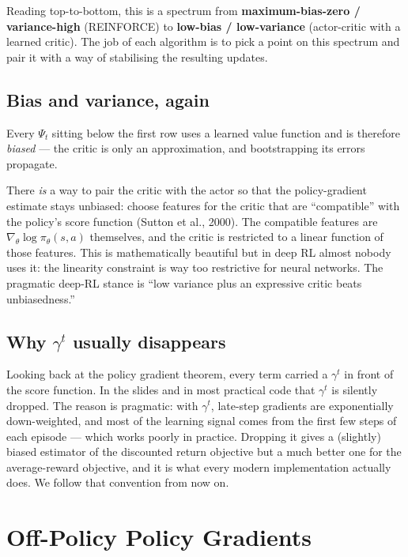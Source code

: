 \documentclass[11pt, oneside]{book}
\begin{document}
Reading top-to-bottom, this is a spectrum from \textbf{maximum-bias-zero / variance-high}
(REINFORCE) to \textbf{low-bias / low-variance} (actor-critic with a learned critic).
The job of each algorithm is to pick a point on this spectrum and pair it with a way
of stabilising the resulting updates.

\subsection{Bias and variance, again}

Every $\Psi_t$ sitting below the first row uses a learned value function and is
therefore \emph{biased} --- the critic is only an approximation, and bootstrapping its
errors propagate.

\begin{intbox}[title={Compatible function approximation (briefly)}]
There \emph{is} a way to pair the critic with the actor so that the policy-gradient
estimate stays unbiased: choose features for the critic that are ``compatible'' with
the policy's score function (Sutton et al., 2000). The compatible features are
$\nabla_\theta \log \pi_\theta(s,a)$ themselves, and the critic is restricted to a
linear function of those features.
This is mathematically beautiful but in deep RL almost nobody uses it: the linearity
constraint is way too restrictive for neural networks.
The pragmatic deep-RL stance is ``low variance plus an expressive critic beats unbiasedness.''
\end{intbox}

\subsection{Why $\gamma^t$ usually disappears}

Looking back at the policy gradient theorem, every term carried a $\gamma^t$ in front
of the score function. In the slides and in most practical code that $\gamma^t$ is
silently dropped. The reason is pragmatic: with $\gamma^t$, late-step gradients are
exponentially down-weighted, and most of the learning signal comes from the first few
steps of each episode --- which works poorly in practice.
Dropping it gives a (slightly) biased estimator of the discounted return objective but
a much better one for the average-reward objective, and it is what every modern
implementation actually does.
We follow that convention from now on.

\section{Off-Policy Policy Gradients}
\end{document}
